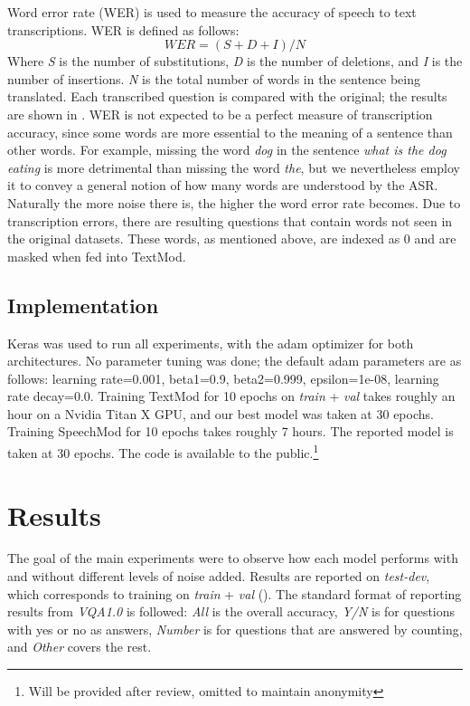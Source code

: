 \documentclass[letterpaper]{article} %
\begin{document}
Word error rate (WER) is used to measure the accuracy of speech to text transcriptions. WER is defined as follows: 
\begin{displaymath}
  \mathit{WER} = (S+D+I)/N
\end{displaymath}
Where \textit{S} is the number of substitutions, \textit{D} is the number of deletions, and \textit{I} is the number of insertions. \textit{N} is the total number of words in the sentence being translated. Each transcribed question is compared with the original; the results are shown in . WER is not expected to be a perfect measure of transcription accuracy, since some words are more essential to the meaning of a sentence than other words. For example, missing the word \emph{dog} in the sentence \emph{what is the dog eating} is more detrimental than missing the word \emph{the}, but we nevertheless employ it to convey a general notion of how many words are understood by the ASR. Naturally the more noise there is, the higher the word error rate becomes. Due to transcription errors, there are resulting questions that contain words not seen in the original datasets. These words, as mentioned above, are indexed as 0 and are masked when fed into TextMod.


\subsection{Implementation}
Keras was used to run all experiments, with the adam optimizer for both architectures. No parameter tuning was done; the default adam parameters are as follows: learning rate=0.001, beta1=0.9, beta2=0.999, epsilon=1e-08, learning  rate decay=0.0. Training TextMod for 10 epochs on \textit{train} + \textit{val} takes roughly an hour on a Nvidia Titan X GPU, and our best model was taken at 30 epochs. Training SpeechMod for 10 epochs takes roughly 7 hours. The reported model is taken at 30 epochs. The code is available to the public.\footnote{Will be provided after review, omitted to maintain anonymity}


\section{Results}
The goal of the main experiments were to observe how each model performs with and without different levels of noise added. Results are reported on \textit{test-dev}, which corresponds to training on \textit{train} + \textit{val} (). The standard format of reporting results from \textit{VQA1.0} is followed: \textit{All} is the overall accuracy, \textit{Y/N} is for questions with yes or no as answers, \textit{Number} is for questions that are answered by counting, and \textit{Other} covers the rest.
\end{document}
